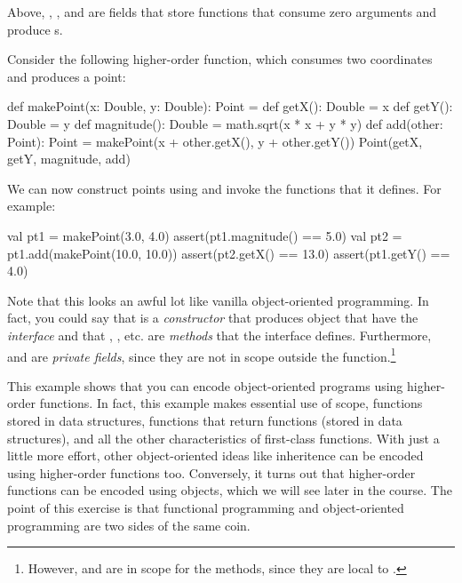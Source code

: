 \documentclass{book}
\begin{document}
Above, , , and 
are fields that store functions that consume zero arguments and produce
s.

Consider the following higher-order function, which consumes two coordinates
and produces a point:
\begin{scalacode}
def makePoint(x: Double, y: Double): Point = {
  def getX(): Double = x
  def getY(): Double = y
  def magnitude(): Double = math.sqrt(x * x + y * y)
  def add(other: Point): Point = makePoint(x + other.getX(), y + other.getY())
  Point(getX, getY, magnitude, add)
}
\end{scalacode}

We can now construct points using 
and invoke the functions that it defines. For example:
%
\begin{scalacode}
val pt1 = makePoint(3.0, 4.0)
assert(pt1.magnitude() == 5.0)
val pt2 = pt1.add(makePoint(10.0, 10.0))
assert(pt2.getX() == 13.0)
assert(pt1.getY() == 4.0)
\end{scalacode}

Note that this looks an awful lot like vanilla object-oriented programming.
In fact, you could say that  is a \emph{constructor}
that produces object that have the \emph{interface} 
and that , , etc. are \emph{methods} that the
interface defines.
Furthermore,  and  are \emph{private fields},
since they are not in scope outside the 
function.\footnote{However,  and  are in scope
for the methods, since they are local to .}

This example shows that you can encode object-oriented programs using
higher-order functions. In fact, this example makes essential use of
scope, functions stored in data structures, functions that return
functions (stored in data structures), and all the other characteristics
of first-class functions. With just a little more effort, other object-oriented
ideas like inheritence can be encoded using higher-order functions too.
Conversely, it turns out that higher-order functions can be encoded using
objects, which we will see later in the course. The point of this exercise
is that functional programming and object-oriented programming are two sides
of the same coin.

\end{document}
